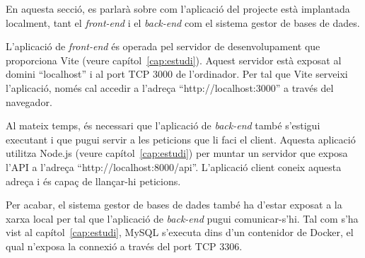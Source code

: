 \documentclass[a4paper,12pt]{ThesisStyle}
\begin{document}
En aquesta secció, es parlarà sobre com l'aplicació del projecte està implantada localment, tant el \textit{front-end} i el \textit{back-end} com el sistema gestor de bases de dades.

L'aplicació de \textit{front-end} és operada pel servidor de desenvolupament que proporciona Vite (veure capítol~\ref{cap:estudi}). Aquest servidor està exposat al domini ``localhost'' i al port TCP 3000 de l'ordinador. Per tal que Vite serveixi l'aplicació, només cal accedir a l'adreça ``http://localhost:3000'' a través del navegador.

Al mateix temps, és necessari que l'aplicació de \textit{back-end} també s'estigui executant i que pugui servir a les peticions que li faci el client. Aquesta aplicació utilitza Node.js (veure capítol~\ref{cap:estudi}) per muntar un servidor que exposa l'API a l'adreça ``http://localhost:8000/api''. L'aplicació client coneix aquesta adreça i és capaç de llançar-hi peticions.

Per acabar, el sistema gestor de bases de dades també ha d'estar exposat a la xarxa local per tal que l'aplicació de \textit{back-end} pugui comunicar-s'hi. Tal com s'ha vist al capítol~\ref{cap:estudi}, MySQL s'executa dins d'un contenidor de Docker, el qual n'exposa la connexió a través del port TCP 3306.
\end{document}
